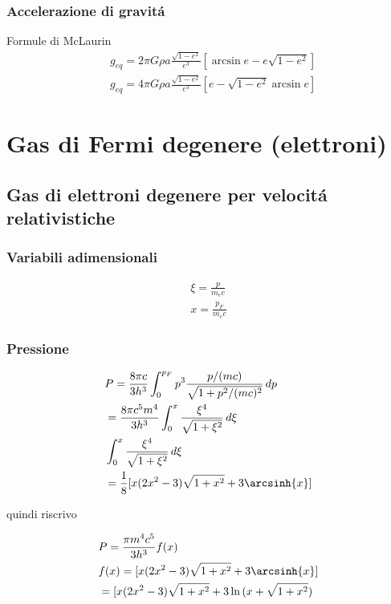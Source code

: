 \documentclass[oneside,12pt,fleqn]{memoir}
\begin{document}
\subsection{Accelerazione di gravit\'a}

Formule di McLaurin
\begin{align*}
&g_{eq}=2\pi G\rho a \frac{\sqrt{1-e^2}}{e^3}[\arcsin{e}-e\sqrt{1-e^2}]\\
&g_{eq}=4\pi G\rho a \frac{\sqrt{1-e^2}}{e^3}[e-\sqrt{1-e^2}\arcsin{e}]
\end{align*}

 
\chapter{Gas di Fermi degenere (elettroni)}
\PartialToc


\section{Gas di elettroni degenere per velocit\'a relativistiche}
 
\subsection{Variabili adimensionali}

\begin{align*}
\xi=\frac{p}{m_ec}\\
x=\frac{p_F}{m_ec}
\end{align*} 

\subsection{Pressione}
 
 \begin{align*}
 &P=\frac{8\pi c}{3h^3}\int_0^{p_F}p^3\frac{p/(mc)}{\sqrt{1+p^2/(mc)^2}}\,dp\\
 &=\frac{8\pi c^5m^4}{3h^3}\int_0^x\frac{\xi^4}{\sqrt{1+\xi^2}}\,d\xi\\
 &\int_0^x\frac{\xi^4}{\sqrt{1+\xi^2}}\,d\xi\\
 &=\frac{1}{8}[x(2x^2-3)\sqrt{1+x^2}+3\arcsinh{x}]
 \end{align*}
 
quindi riscrivo

\begin{align*}
&P=\frac{\pi m^4c^5}{3h^3}f(x)\\
&f(x)=[x(2x^2-3)\sqrt{1+x^2}+3\arcsinh{x}]\\
&=[x(2x^2-3)\sqrt{1+x^2}+3\ln{(x+\sqrt{1+x^2})}
\end{align*}
\end{document}
